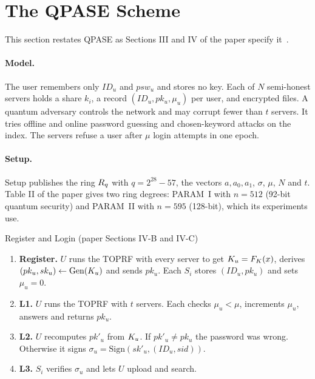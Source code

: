 \section{The QPASE Scheme}
\label{sec:qpase}

This section restates QPASE as Sections III and IV of the paper specify it~\cite{jiang2024qpase}.

\paragraph{Model.} The user remembers only $ID_u$ and $psw_u$ and stores no key. Each of $N$ semi-honest servers
holds a share $k_i$, a record $(ID_u, pk_u, \mu_u)$ per user, and encrypted files. A quantum adversary controls the
network and may corrupt fewer than $t$ servers. It tries offline and online password guessing and chosen-keyword
attacks on the index. The servers refuse a user after $\mu$ login attempts in one epoch.

\paragraph{Setup.} Setup publishes the ring $R_q$ with $q = 2^{28} - 57$, the vectors $a, a_0, a_1$, $\sigma$,
$\mu$, $N$ and $t$. Table II of the paper gives two ring degrees: PARAM~I with $n = 512$ (92-bit quantum security)
and PARAM~II with $n = 595$ (128-bit), which its experiments use.

\begin{protocol}{Register and Login (paper Sections IV-B and IV-C)}
\begin{enumerate}[1.]
  \item \textbf{Register.} $U$ runs the TOPRF with every server to get $K_u = F_K(x)$, derives
        $(pk_u, sk_u) \leftarrow \mathrm{Gen}(K_u)$ and sends $pk_u$. Each $S_i$ stores $(ID_u, pk_u)$ and sets
        $\mu_u = 0$.
  \item \textbf{L1.} $U$ runs the TOPRF with $t$ servers. Each checks $\mu_u < \mu$, increments $\mu_u$, answers
        and returns $pk_u$.
  \item \textbf{L2.} $U$ recomputes $pk'_u$ from $K_u$. If $pk'_u \neq pk_u$ the password was wrong. Otherwise it
        signs $\sigma_u = \mathrm{Sign}(sk'_u, (ID_u, sid))$.
  \item \textbf{L3.} $S_i$ verifies $\sigma_u$ and lets $U$ upload and search.
\end{enumerate}
\end{protocol}

